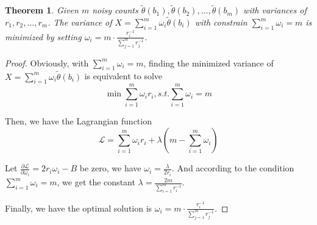 \documentclass[conference]{IEEEtran}
\newtheorem{theorem}{\bf Theorem}[section]
\newtheorem*{proof}{\text{$Proof.$}}
\begin{document}
\begin{theorem}\label{minimized noisy count}
Given $m$ noisy counts $\tilde{\theta}(b_1),\tilde{\theta}(b_2),...,\tilde{\theta}(b_m)$ with variances of $r_1,r_2,...,r_m$. The variance of $X = \sum_{i=1}^{m}\omega_i\tilde{\theta}(b_i)$ with constrain $\sum_{i=1}^{m}\omega_i = m$ is minimized by setting $\omega_i = m \cdot \frac{r_i^{-1} }{\sum_{j=1}^{m} r_j^{-1}}$.
\end{theorem}

\begin{proof}
Obviously, with $\sum_{i=1}^{m}\omega_i = m$, finding the minimized variance of $X = \sum_{i=1}^{m}\omega_i\tilde{\theta}(b_i)$ is equivalent to solve
\begin{equation}
\min{\sum_{i=1}^{m}\omega_i r_i , s.t. \sum_{i=1}^{m}\omega_i = m } \label{weigh mine}
\end{equation}

Then, we have the Lagrangian function
$$\mathcal{L} = \sum_{i=1}^{m}\omega_i r_i + \lambda(m - \sum_{i=1}^{m}\omega_i)$$

Let $\frac{\partial {\mathcal{L}}}{ \partial{\omega_i}} = 2r_i \omega_i - B$ be zero, we have $\omega_i = \frac{\lambda}{2r_i}$. And according to the condition $\sum_{i=1}^{m}\omega_i = m$, we get the constant $\lambda = \frac{2m}{\sum_{i=1}^{m} r_i^{-1}}$.

Finally, we have the optimal solution is $\omega_i = m \cdot \frac{r_i^{-1} }{\sum_{j=1}^{m} r_j^{-1}}$.

\end{proof}
\end{document}
